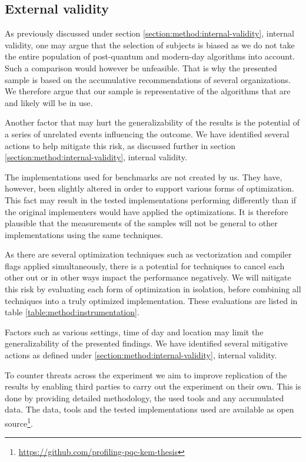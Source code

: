 \subsection{External validity}

As previously discussed under section \ref{section:method:internal-validity}, internal validity, one may argue that the selection of subjects is biased as we do not take the entire population of post-quantum and modern-day algorithms into account. Such a comparison would however be unfeasible. That is why the presented sample is based on the accumulative recommendations of several organizations. We therefore argue that our sample is representative of the algorithms that are and likely will be in use.

Another factor that may hurt the generalizability of the results is the potential of a series of unrelated events influencing the outcome. We have identified several actions to help mitigate this risk, as discussed further in section \ref{section:method:internal-validity}, internal validity.

The implementations used for benchmarks are not created by us. They have, however, been slightly altered in order to support various forms of optimization. This fact may result in the tested implementations performing differently than if the original implementers would have applied the optimizations. It is therefore plausible that the measurements of the samples will not be general to other implementations using the same techniques.

As there are several optimization techniques such as vectorization and compiler flags applied simultaneously, there is a potential for techniques to cancel each other out or in other ways impact the performance negatively. We will mitigate this risk by evaluating each form of optimization in isolation, before combining all techniques into a truly optimized implementation. These evaluations are listed in table \ref{table:method:instrumentation}.

Factors such as various settings, time of day and location may limit the generalizability of the presented findings. We have identified several mitigative actions as defined under \ref{section:method:internal-validity}, internal validity.

To counter threats across the experiment we aim to improve replication of the results by enabling third parties to carry out the experiment on their own. This is done by providing detailed methodology, the used tools and any accumulated data. The data, tools and the tested implementations used are available as open source\footnote{\href{https://github.com/profiling-pqc-kem-thesis}{https://github.com/profiling-pqc-kem-thesis}}.
